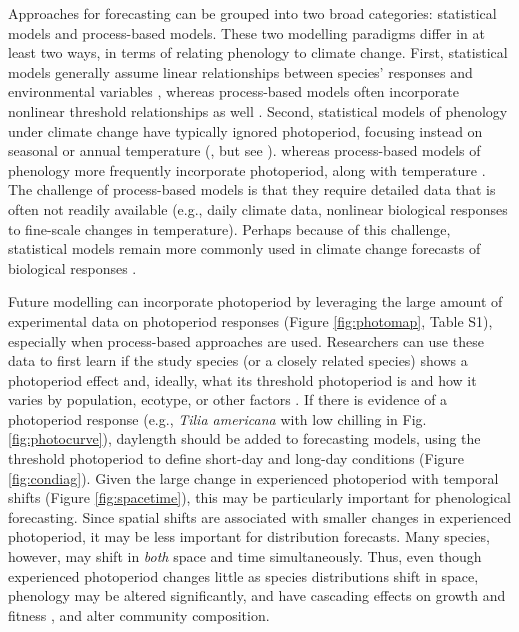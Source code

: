 \documentclass{article}
\begin{document}
\par Approaches for forecasting can be grouped into two broad categories: statistical models and process-based models. These two modelling paradigms differ in at least two ways, in terms of relating phenology to climate change. First, statistical models generally assume linear relationships between species' responses and environmental variables \citep[e.g., ][]{flynn2018,van2007,ibanez2010}, whereas process-based models often incorporate nonlinear threshold relationships as well \citep[e.g.][]{chuine2001,morin2009,xie1989}. Second, statistical models of phenology under climate change have typically ignored photoperiod, focusing instead on seasonal or annual temperature (\citet[e.g.][]{van2007,ibanez2010,diez2012}, but see \citet{richardson2013}). %
whereas process-based models of phenology more frequently incorporate photoperiod, along with temperature \citep{duputie2015,morin2009,xie1989,zhao2013}. The challenge of process-based models is that they require detailed data that is often not readily available (e.g., daily climate data, nonlinear biological responses to fine-scale changes in temperature). Perhaps because of this challenge, statistical models remain more commonly used in climate change forecasts of biological responses \citep[e.g.,][]{Basler:2012, zhu2012,garcia2016,van2007,ibanez2010,diez2012}.

\par Future modelling can incorporate photoperiod by leveraging the large amount of experimental data on photoperiod responses (Figure \ref{fig:photomap}, Table S1), especially when process-based approaches are used. Researchers can use these data to first learn if the study species (or a closely related species) shows a photoperiod effect and, ideally, what its threshold photoperiod is and how it varies by population, ecotype, or other factors \citep{bradshaw2006,gwinner1996,tobin2008}. If there is evidence of a photoperiod response (e.g., \emph{Tilia americana} with low chilling in Fig. \ref {fig:photocurve}), daylength should be added to forecasting models, using the threshold photoperiod to define short-day and long-day conditions (Figure \ref{fig:condiag}). Given the large change in experienced photoperiod with temporal shifts (Figure \ref{fig:spacetime}), this may be particularly important for phenological forecasting. Since spatial shifts are associated with smaller changes in experienced photoperiod, it may be less important for distribution forecasts. Many species, however, may shift in \emph{both} space and time simultaneously. Thus, even though experienced photoperiod changes little as species distributions shift in space, phenology may be altered significantly, and have cascading effects on growth and fitness \citep{duputie2015}, and alter community  composition.
\end{document}

